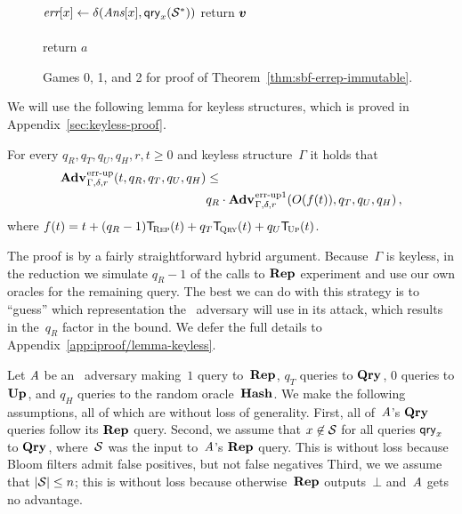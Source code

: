 \begin{figure*}
{{    \tab\tab $\textit{err}[x] \gets \delta(\textit{Ans}[x],\mathsf{qry}_x(\mathcal{S}^*))$
    }
    return $\boldsymbol{v}$
}
{
  \vspace{-7pt}
  \
      \hfill {} \\[2pt]
    \\[2pt]
    return $a$
}
\caption{Games 0, 1, and 2 for proof of Theorem~\ref{thm:sbf-errep-immutable}.}
\label{fig:sbf-errep-immutable/games}
\end{figure*}

We will use the following lemma for keyless structures, which is proved in
Appendix~\ref{sec:keyless-proof}.

\begin{lemma}\label{thm:lemma1}
  For every $q_R, q_T, q_U, q_H, r, t \geq 0$ and keyless structure~$\Gamma$ it
  holds that
  \begin{eqnarray*}
    \begin{aligned}
      \Adv{\errep}_{\Gamma,\delta,r}(t, q_R, q_T, q_U, q_H) &\leq \\
      & q_R \cdot \Adv{\errep1}_{\Gamma,\delta,r}(O(f(t)), q_T, q_U, q_H) \,,
    \end{aligned}
  \end{eqnarray*}
  where $f(t) = t + (q_R-1)\ticks(\Rep,t) + q_T\ticks(\Qry,t) + q_U\ticks(\Up,t)$.
\end{lemma}
%
\noindent
The proof is by a fairly straightforward hybrid argument. Because~$\Gamma$ is
keyless, in the reduction we simulate $q_R-1$ of the calls to $\textup{\textbf{Rep}}\hspace{0.5pt}$ experiment
and use our own oracles for the remaining query. The best we can do with this
strategy is to ``guess'' which representation the \errep\ adversary will use in
its attack, which results in the~$q_R$ factor in the bound.
%
We defer the full details to Appendix~\ref{app:iproof/lemma-keyless}.

Let $\mathit{A}$ be an \errep\ adversary making~$1$ query to~$\textup{\textbf{Rep}}\hspace{0.5pt}$, $q_T$ queries
to $\textup{\textbf{Qry}}\hspace{0.5pt}$, $0$ queries to $\textup{\textbf{Up}}\hspace{0.5pt}$, and $q_H$ queries to the random
oracle~$\textup{\textbf{Hash}}\hspace{0.5pt}$.
%
We make the following assumptions, all of which are without loss of generality.
%
First, all of~$\mathit{A}$'s $\textup{\textbf{Qry}}\hspace{0.5pt}$ queries follow its $\textup{\textbf{Rep}}\hspace{0.5pt}$ query.
%
Second, we assume that $x\not\in\mathcal{S}$ for all queries $\mathsf{qry}_x$ to $\textup{\textbf{Qry}}\hspace{0.5pt}$,
where~$\mathcal{S}$ was the input to~$\mathit{A}$'s $\textup{\textbf{Rep}}\hspace{0.5pt}$ query. This is without loss
because Bloom filters admit false positives, but not false negatives
%
Third, we we assume that $|\mathcal{S}| \leq n$; this is without loss because
otherwise~$\textup{\textbf{Rep}}\hspace{0.5pt}$ outputs~$\bot$ and~$\mathit{A}$ gets no advantage.

